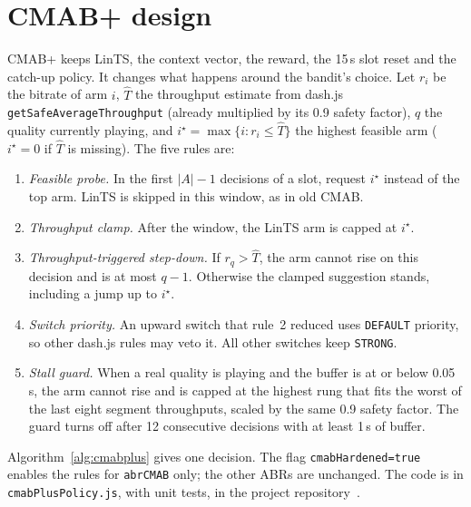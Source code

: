 \documentclass[sigconf]{acmart}
\newcommand{\cmabp}{CMAB+\xspace}
\newcommand{\oldcmab}{old CMAB\xspace}
\newcommand{\That}{\hat{T}}
\begin{document}
\section{CMAB+ design}
\label{sec:design}

\cmabp keeps LinTS, the context vector, the reward, the 15\,s slot reset and the catch-up policy. It changes what happens around the bandit's choice. Let $r_i$ be the bitrate of arm $i$, $\That$ the throughput estimate from dash.js \texttt{getSafeAverageThroughput} (already multiplied by its 0.9 safety factor), $q$ the quality currently playing, and $i^\star=\max\{i: r_i\le\That\}$ the highest feasible arm ($i^\star=0$ if $\That$ is missing). The five rules are:

\begin{enumerate}
\item \emph{Feasible probe.} In the first $|A|-1$ decisions of a slot, request $i^\star$ instead of the top arm. LinTS is skipped in this window, as in \oldcmab.
\item \emph{Throughput clamp.} After the window, the LinTS arm is capped at $i^\star$.
\item \emph{Throughput-triggered step-down.} If $r_q>\That$, the arm cannot rise on this decision and is at most $q-1$. Otherwise the clamped suggestion stands, including a jump up to $i^\star$.
\item \emph{Switch priority.} An upward switch that rule~2 reduced uses \texttt{DEFAULT} priority, so other dash.js rules may veto it. All other switches keep \texttt{STRONG}.
\item \emph{Stall guard.} When a real quality is playing and the buffer is at or below 0.05\,s, the arm cannot rise and is capped at the highest rung that fits the worst of the last eight segment throughputs, scaled by the same 0.9 safety factor. The guard turns off after 12 consecutive decisions with at least 1\,s of buffer.
\end{enumerate}

\noindent Algorithm~\ref{alg:cmabplus} gives one decision. The flag \texttt{cmabHardened=true} enables the rules for \texttt{abrCMAB} only; the other ABRs are unchanged. The code is in \texttt{cmabPlusPolicy.js}, with unit tests, in the project repository~\cite{cmabplus}.
\end{document}
